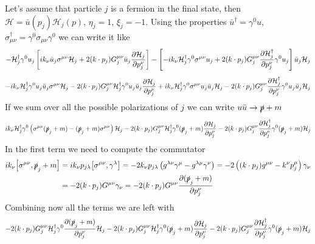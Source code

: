 \documentclass{article}
\newcommand{\s}[1]{\slashed #1}
\begin{document}
Let's assume that particle $j$ is a fermion in the final state,
then $\mathcal{H}=\bar{u}(p_j) \mathcal{H}_j(p)$, $\eta_j=1$, $\xi_j=-1$.
Using the properties $\bar{u}^\dag = \gamma^0u$,
$\sigma_{\mu\nu}^\dag = \gamma^0 \sigma_{\mu\nu}\gamma^0$ we can write it like
\begin{equation*}
	-\mathcal{H}_j^\dag \gamma^0 u_j \left[
		i k_\nu \bar{u}_j \sigma^{\mu\nu} \mathcal{H}_j
		+2 (k \cdot p_j) G_j^{\mu \nu} \bar{u}_j \pdv{\mathcal{H}_j}{p_{j}^\nu}
	\right]
	- \left[
		- i k_\nu \mathcal{H}_j^\dag \gamma^0 \sigma^{\mu\nu} u_j
		+ 2(k \cdot p_j) G_j^{\mu \nu} \pdv{\mathcal{H}^\dag_j}{p_{j}^\nu} \gamma^0 u_j
	\right] \bar{u}_j \mathcal{H}_j
\end{equation*}
\begin{equation*}
	-i k_\nu \mathcal{H}_j^\dag \gamma^0 u_j \bar{u}_j \sigma^{\mu\nu} \mathcal{H}_j
	- 2 (k \cdot p_j) G_j^{\mu \nu} \mathcal{H}_j^\dag \gamma^0 u_j
	\bar{u}_j \pdv{\mathcal{H}_j}{p_{j}^\nu}
	+ i k_\nu \mathcal{H}_j^\dag \gamma^0 \sigma^{\mu\nu} u_j \bar{u}_j \mathcal{H}_j
	- 2(k \cdot p_j) G_j^{\mu \nu} \pdv{\mathcal{H}^\dag_j}{p_{j}^\nu} \gamma^0 u_j
	\bar{u}_j \mathcal{H}_j
\end{equation*}
If we sum over all the possible polarizations of $j$ we can write $u\bar{u}\to \s{p}+m$
\begin{equation*}
	i k_\nu \mathcal{H}_j^\dag \gamma^0
	\left(\sigma^{\mu\nu}(\s{p}_j + m) - (\s{p}_j + m) \sigma^{\mu\nu}\right) \mathcal{H}_j
	- 2(k \cdot p_j) G_j^{\mu \nu} \mathcal{H}_j^\dag
	\gamma^0 (\s{p}_j + m) \pdv{\mathcal{H}_j}{p_{j}^\nu}
	- 2(k \cdot p_j) G_j^{\mu \nu} \pdv{\mathcal{H}^\dag_j}{p_{j}^\nu}
	\gamma^0 (\s{p}_j + m) \mathcal{H}_j
\end{equation*}
In the first term we need to compute the commutator
\begin{align*}
	ik_\nu \comm{\sigma^{\mu\nu}}{\s{p}_j + m}&
	= i k_\nu p_{j\lambda} \comm{\sigma^{\mu\nu}}{\gamma^\lambda}
	= -2k_\nu p_{j\lambda}
	\left(g^{\lambda \nu} \gamma^\mu - g^{\lambda \mu} \gamma^\nu\right)
	= -2\left((k \cdot p_j) g^{\mu\nu} - k^\nu p_{j}^\mu\right) \gamma_\nu \\&
	= -2(k \cdot p_j) G^{\mu\nu} \gamma_\nu
	= -2(k \cdot p_j) G^{\mu\nu} \pdv{(\s{p}_j + m)}{p_{j}^\nu}
\end{align*}
Combining now all the terms we are left with
\begin{equation*}
	-2(k \cdot p_j) G_j^{\mu \nu} \mathcal{H}_j^\dag \gamma^0
	\pdv{(\s{p}_j + m)}{p_{j}^\nu} \mathcal{H}_j
	- 2(k \cdot p_j) G_j^{\mu \nu} \mathcal{H}_j^\dag \gamma^0
	(\s{p}_j + m) \pdv{\mathcal{H}_j}{p_{j}^\nu}
	- 2(k \cdot p_j) G_j^{\mu \nu} \pdv{\mathcal{H}^\dag_j}{p_{j}^\nu}
	\gamma^0 (\s{p}_j + m) \mathcal{H}_j
\end{equation*}
\end{document}
